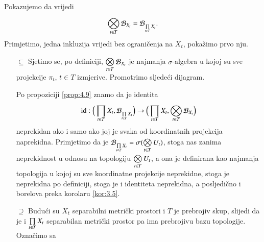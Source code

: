 \begin{rj}[\ref{zad:4.4}]
    Pokazujemo da vrijedi
    \begin{equation*}
        \bigotimes\limits_{t \in T}^{} \mathcal{B}_{X_t} = \mathcal{B}_{\prod\limits_{t \in T}^{} X_t}.
    \end{equation*}
    Primjetimo, jedna inkluzija vrijedi bez ograni\v cenja na $X_t$, poka\v zimo prvo nju.
    \begin{enumerate}
        \item[$\subseteq$]
        Sjetimo se, po definiciji, $\bigotimes\limits_{t \in T}^{} \mathcal{B}_{X_t}$ je najmanja $\sigma$-algebra u kojoj su sve projekcije $\pi_t$, $t \in T$ izmjerive.
        Promotrimo sljede\' ci dijagram.
        \begin{figure}[H]
            \centering
        \end{figure}
        Po propoziciji \ref{prop:4.9} znamo da je identita
        \begin{equation*}
            \mathrm{id} : \Big( \prod\limits_{t \in T}^{} X_t, \mathcal{B}_{\prod\limits_{t \in T}^{} X_t} \Big) \to \Big( \prod\limits_{t \in T}^{} X_t,  \bigotimes\limits_{t \in T}^{} \mathcal{B}_{X_t} \Big)
        \end{equation*}
        neprekidan ako i samo ako joj je svaka od koordinatnih projekcija naprekidna.
        Primjetimo da je $\mathcal{B}_{\prod\limits_{t \in T}^{} X_t} = \sigma({\bigotimes\limits_{t \in T}^{} U_t})$, stoga nas zanima neprekidnost u odnosu na topologiju $\bigotimes\limits_{t \in T}^{} U_t$, a ona je definirana kao najmanja topologija u kojoj su sve koordinatne projekcije neprekidne, stoga je neprekidna po definiciji, stoga je i identiteta neprekidna, a posljedi\v cno i borelova preka korolaru \ref{kor:3.5}.
        \item[$\supseteq$]
        Budu\' ci su $X_t$ separabilni metri\v cki prostori i $T$ je prebrojiv skup, slijedi da je i $\prod\limits_{t \in T}^{} X_t$ separabilan metri\v cki prostor pa ima prebrojivu bazu topologije. Ozna\v cimo sa

\end{enumerate}
\end{rj}
